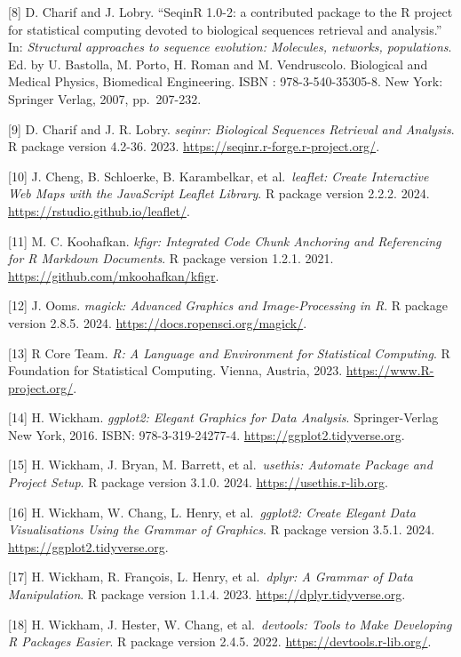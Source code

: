 \documentclass[
  12pt,
]{article}
\begin{document}
{[}8{]} D. Charif and J. Lobry. ``SeqinR 1.0-2: a contributed package to the
R project for statistical computing devoted to biological sequences
retrieval and analysis.'' In: \emph{Structural approaches to sequence
evolution: Molecules, networks, populations}. Ed. by U. Bastolla, M.
Porto, H. Roman and M. Vendruscolo. Biological and Medical Physics,
Biomedical Engineering. ISBN : 978-3-540-35305-8. New York: Springer
Verlag, 2007, pp.~207-232.

{[}9{]} D. Charif and J. R. Lobry. \emph{seqinr: Biological Sequences Retrieval
and Analysis}. R package version 4.2-36. 2023.
\url{https://seqinr.r-forge.r-project.org/}.

{[}10{]} J. Cheng, B. Schloerke, B. Karambelkar, et al.~\emph{leaflet: Create
Interactive Web Maps with the JavaScript Leaflet Library}. R package
version 2.2.2. 2024. \url{https://rstudio.github.io/leaflet/}.

{[}11{]} M. C. Koohafkan. \emph{kfigr: Integrated Code Chunk Anchoring and
Referencing for R Markdown Documents}. R package version 1.2.1. 2021.
\url{https://github.com/mkoohafkan/kfigr}.

{[}12{]} J. Ooms. \emph{magick: Advanced Graphics and Image-Processing in R}. R
package version 2.8.5. 2024. \url{https://docs.ropensci.org/magick/}.

{[}13{]} R Core Team. \emph{R: A Language and Environment for Statistical
Computing}. R Foundation for Statistical Computing. Vienna, Austria,
2023. \url{https://www.R-project.org/}.

{[}14{]} H. Wickham. \emph{ggplot2: Elegant Graphics for Data Analysis}.
Springer-Verlag New York, 2016. ISBN: 978-3-319-24277-4.
\url{https://ggplot2.tidyverse.org}.

{[}15{]} H. Wickham, J. Bryan, M. Barrett, et al.~\emph{usethis: Automate
Package and Project Setup}. R package version 3.1.0. 2024.
\url{https://usethis.r-lib.org}.

{[}16{]} H. Wickham, W. Chang, L. Henry, et al.~\emph{ggplot2: Create Elegant
Data Visualisations Using the Grammar of Graphics}. R package version
3.5.1. 2024. \url{https://ggplot2.tidyverse.org}.

{[}17{]} H. Wickham, R. François, L. Henry, et al.~\emph{dplyr: A Grammar of
Data Manipulation}. R package version 1.1.4. 2023.
\url{https://dplyr.tidyverse.org}.

{[}18{]} H. Wickham, J. Hester, W. Chang, et al.~\emph{devtools: Tools to Make
Developing R Packages Easier}. R package version 2.4.5. 2022.
\url{https://devtools.r-lib.org/}.
\end{document}
